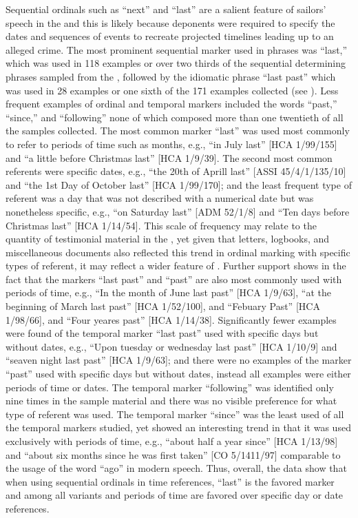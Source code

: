 Sequential ordinals such as “next” and “last” are a salient feature of sailors’ speech in the  and this is likely because deponents were required to specify the dates and sequences of events to recreate projected timelines leading up to an alleged crime. The most prominent sequential marker used in  phrases was “last,” which was used in 118 examples or over two thirds of the sequential determining phrases sampled from the , followed by the idiomatic phrase “last past” which was used in 28 examples or one sixth of the 171 examples collected (see ). Less frequent examples of ordinal and temporal markers included the words “past,” “since,” and “following” none of which composed more than one twentieth of all the samples collected. The most common marker “last” was used most commonly to refer to periods of time such as months, e.g., “in July last” [HCA 1/99/155] and “a little before Christmas last” [HCA 1/9/39]. The second most common referents were specific dates, e.g., “the 20th of Aprill last” [ASSI 45/4/1/135/10] and “the 1st Day of October last” [HCA 1/99/170]; and the least frequent type of referent was a day that was not described with a numerical date but was nonetheless specific, e.g., “on Saturday last” [ADM 52/1/8] and “Ten days before Christmas last” [HCA 1/14/54]. This scale of frequency may relate to the quantity of testimonial material in the , yet given that letters, logbooks, and miscellaneous documents also reflected this trend in ordinal marking with specific types of referent, it may reflect a wider feature of . Further support shows in the fact that the markers “last past” and “past” are also most commonly used with periods of time, e.g., “In the month of June last past” [HCA 1/9/63], “at the beginning of March last past” [HCA 1/52/100], and “Febuary Past” [HCA 1/98/66], and “Four yeares past” [HCA 1/14/38]. Significantly fewer examples were found of the temporal marker “last past” used with specific days but without dates, e.g., “Upon tuesday or wednesday last past” [HCA 1/10/9] and “seaven night last past” [HCA 1/9/63]; and there were no examples of the marker “past” used with specific days but without dates, instead all examples were either periods of time or dates. The temporal marker “following” was identified only nine times in the sample material and there was no visible preference for what type of referent was used. The temporal marker “since” was the least used of all the temporal markers studied, yet showed an interesting trend in that it was used exclusively with periods of time, e.g., “about half a year since” [HCA 1/13/98] and “about six months since he was first taken” [CO 5/1411/97] comparable to the usage of the word “ago” in modern speech. Thus, overall, the data show that when using sequential ordinals in time references, “last” is the favored marker and among all variants and periods of time are favored over specific day or date references. 

